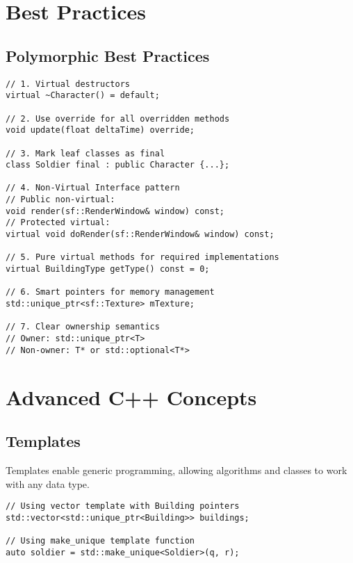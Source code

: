 \documentclass{article}
\begin{document}
\section{Best Practices}

\subsection{Polymorphic Best Practices}

\begin{lstlisting}[caption=Polymorphic Best Practices]
// 1. Virtual destructors
virtual ~Character() = default;

// 2. Use override for all overridden methods
void update(float deltaTime) override;

// 3. Mark leaf classes as final
class Soldier final : public Character {...};

// 4. Non-Virtual Interface pattern
// Public non-virtual:
void render(sf::RenderWindow& window) const;
// Protected virtual:
virtual void doRender(sf::RenderWindow& window) const;

// 5. Pure virtual methods for required implementations
virtual BuildingType getType() const = 0;

// 6. Smart pointers for memory management
std::unique_ptr<sf::Texture> mTexture;

// 7. Clear ownership semantics
// Owner: std::unique_ptr<T>
// Non-owner: T* or std::optional<T*>
\end{lstlisting}

\section{Advanced C++ Concepts}

\subsection{Templates}

Templates enable generic programming, allowing algorithms and classes to work with any data type.

\begin{lstlisting}[caption=Templates Example (Standard Library Usage)]
// Using vector template with Building pointers
std::vector<std::unique_ptr<Building>> buildings;

// Using make_unique template function
auto soldier = std::make_unique<Soldier>(q, r);
\end{lstlisting}
\end{document}
